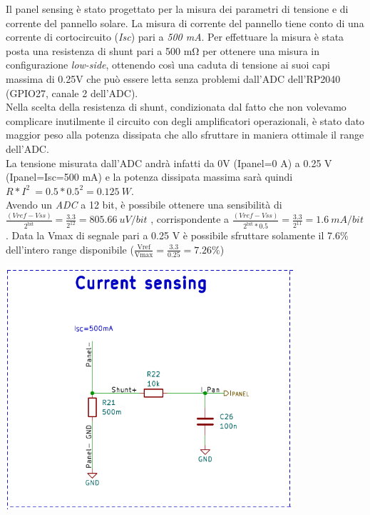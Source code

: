Il panel sensing è stato progettato per la misura dei parametri di
tensione e di corrente del pannello solare. La misura di corrente del
pannello tiene conto di una corrente di cortocircuito (\emph{Isc}) pari
a \emph{500 mA}. Per effettuare la misura è stata posta una resistenza
di shunt pari a 500 mΩ per ottenere una misura in configurazione \emph{low-side},
ottenendo così una caduta di tensione ai suoi capi massima di 0.25V che
può essere letta senza problemi dall'ADC dell'RP2040 (GPIO27, canale 2
dell'ADC).\\
Nella scelta della resistenza di shunt, condizionata dal fatto che non
volevamo complicare inutilmente il circuito con degli amplificatori
operazionali, è stato dato maggior peso alla potenza dissipata che allo
sfruttare in maniera ottimale il range dell'ADC.\\
La tensione misurata dall'ADC andrà infatti da 0V (Ipanel=0 A) a 0.25 V
(Ipanel=Isc=500 mA) e la potenza dissipata massima sarà quindi
\(R*I^{2}\  = 0.5*0.5^{2} = 0.125\ W\).\\
Avendo un \emph{ADC} a 12 bit, è possibile ottenere una sensibilità di
\(\frac{(Vref - Vss)}{2^{\text{bit}}} = \frac{3.3}{2^{12}} = 805.66\ uV/bit\)
, corrispondente a
\(\frac{(Vref - Vss)}{2^{\text{bit}}*0.5} = \frac{3.3}{2^{11}} = 1.6\ mA/bit\).
Data la Vmax di segnale pari a 0.25 V è possibile sfruttare solamente il
7.6\% dell'intero range disponibile
(\(\frac{\text{Vref}}{\text{Vmax}} = \frac{3.3}{0.25} = 7.26\%\))

\begin{center}
\includegraphics[width=4.19954in,height=3.53646in]{figures/image19.png}
\captionsetup{type=figure}
\end{center}

